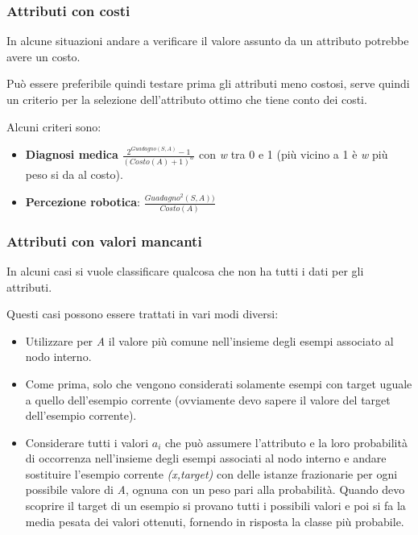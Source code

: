 \subsubsection{Attributi con costi}\label{attributi-con-costi}

In alcune situazioni andare a verificare il valore assunto da un
attributo potrebbe avere un costo.

Può essere preferibile quindi testare prima gli attributi meno costosi,
serve quindi un criterio per la selezione dell'attributo ottimo che
tiene conto dei costi.

Alcuni criteri sono:

\begin{itemize}
\item \textbf{Diagnosi medica} $\frac{2^{Guadagno(S,A)}-1}{(Costo(A)+1)^w}$ con
\emph{w} tra 0 e 1 (più vicino a 1 è \emph{w} più peso si da al costo).

\item \textbf{Percezione robotica}: $\frac{Guadagno^2(S,A))}{Costo(A)}$
\end{itemize}

\subsubsection{Attributi con valori mancanti}\label{attributi-con-valori-mancanti}

In alcuni casi si vuole classificare qualcosa che non ha tutti i dati
per gli attributi.

Questi casi possono essere trattati in vari modi diversi:

\begin{itemize}
\item
  Utilizzare per \emph{A} il valore più comune nell'insieme degli esempi
  associato al nodo interno.
\item
  Come prima, solo che vengono considerati solamente esempi con target
  uguale a quello dell'esempio corrente (ovviamente devo sapere il
  valore del target dell'esempio corrente).
\item
  Considerare tutti i valori $a_i$ che può assumere l'attributo e la
  loro probabilità di occorrenza nell'insieme degli esempi associati al
  nodo interno e andare sostituire l'esempio corrente \emph{(x,target)}
  con delle istanze frazionarie per ogni possibile valore di \emph{A},
  ognuna con un peso pari alla probabilità. Quando devo scoprire il
  target di un esempio si provano tutti i possibili valori e poi si fa la media pesata dei valori ottenuti, fornendo in risposta la classe più probabile.
\end{itemize}

